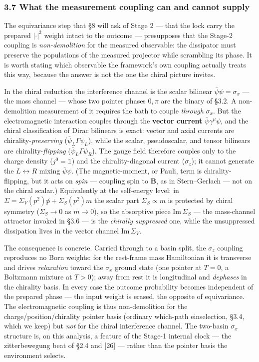 \documentclass[
]{article}
\begin{document}
\subsubsection{3.7 What the measurement coupling can and cannot
supply}\label{what-the-measurement-coupling-can-and-cannot-supply}

The equivariance step that §8 will ask of Stage 2 --- that the lock
carry the prepared \(|\cdot|^2\) weight intact to the outcome ---
presupposes that the Stage-2 coupling is \emph{non-demolition} for the
measured observable: the dissipator must preserve the populations of the
measured projector while scrambling its phase. It is worth stating which
observable the framework's own coupling actually treats this way,
because the answer is not the one the chiral picture invites.

In the chiral reduction the interference channel is the scalar bilinear
\(\bar\psi\psi=\sigma_x\) --- the mass channel --- whose two pointer
phases \(0,\pi\) are the binary of §3.2. A non-demolition measurement of
it requires the bath to couple \emph{through} \(\sigma_x\). But the
electromagnetic interaction couples through the \textbf{vector current}
\(\bar\psi\gamma^\mu\psi\), and the chiral classification of Dirac
bilinears is exact: vector and axial currents are
chirality-\emph{preserving} (\(\bar\psi_L\Gamma\psi_L\)), while the
scalar, pseudoscalar, and tensor bilinears are chirality-\emph{flipping}
(\(\bar\psi_L\Gamma\psi_R\)). The gauge field therefore couples only to
the charge density (\(j^0=\mathbb{1}\)) and the chirality-diagonal
current (\(\sigma_z\)); it cannot generate the \(L\leftrightarrow R\)
mixing \(\bar\psi\psi\). (The magnetic-moment, or Pauli, term is
chirality-flipping, but it acts on \emph{spin} --- coupling spin to
\(\mathbf B\), as in Stern--Gerlach --- not on the chiral scalar.)
Equivalently at the self-energy level: in
\(\Sigma=\Sigma_V(p^2)\not p+\Sigma_S(p^2)m\) the scalar part
\(\Sigma_S\propto m\) is protected by chiral symmetry (\(\Sigma_S\to0\)
as \(m\to0\)), so the absorptive piece \(\mathrm{Im}\,\Sigma_S\) --- the
mass-channel attractor invoked in §3.6 --- is the \emph{chirally
suppressed} one, while the unsuppressed dissipation lives in the vector
channel \(\mathrm{Im}\,\Sigma_V\).

The consequence is concrete. Carried through to a basin split, the
\(\sigma_z\) coupling reproduces no Born weights: for the rest-frame
mass Hamiltonian it is transverse and drives \emph{relaxation} toward
the \(\sigma_x\) ground state (one pointer at \(T=0\), a Boltzmann
mixture at \(T>0\)); away from rest it is longitudinal and
\emph{dephases} in the chirality basis. In every case the outcome
probability becomes independent of the prepared phase --- the input
weight is erased, the opposite of equivariance. The electromagnetic
coupling is thus non-demolition for the charge/position/chirality
pointer basis (ordinary which-path einselection, §3.4, which we keep)
but \emph{not} for the chiral interference channel. The two-basin
\(\sigma_x\) structure is, on this analysis, a feature of the Stage-1
internal clock --- the zitterbewegung beat of §2.4 and {[}26{]} ---
rather than the pointer basis the environment selects.
\end{document}
